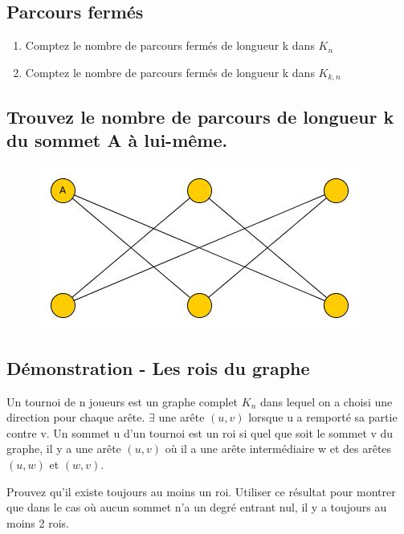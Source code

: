 \subsection{Parcours fermés}
\begin{enumerate}
\item{Comptez le nombre de parcours fermés de longueur k dans $K_{n}$}
\item{Comptez le nombre de parcours fermés de longueur k dans $K_{k,n}$}
\end{enumerate}

\subsection{Trouvez le nombre de parcours de longueur k du sommet A à lui-même.}
\begin{figure}
\center
\includegraphics[scale=0.5]{graph_ape1_ex5}
\end{figure}

\subsection{Démonstration - Les rois du graphe}
Un tournoi de n joueurs est un graphe complet $K_{n}$ dans lequel on a choisi une direction pour chaque arête. $\exists$ une arête $(u,v)$ lorsque u a remporté sa partie contre v. Un sommet u d'un tournoi est un roi si quel que soit le sommet v du graphe, il y a une arête $(u,v)$ où il a une arête intermédiaire w et des arêtes $(u,w)$ et $(w,v)$.

Prouvez qu'il existe toujours au moins un roi.
Utiliser ce résultat pour montrer que dans le cas où aucun sommet n'a un degré entrant nul, il y a toujours au moins 2 rois.


